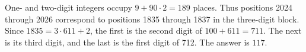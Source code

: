 One- and two-digit integers occupy $9+90\cdot2=189$ places. Thus positions 2024 through 2026 correspond to positions 1835 through 1837 in the three-digit block. Since $1835=3\cdot611+2$, the first is the second digit of $100+611=711$. The next is its third digit, and the last is the first digit of 712. The answer is $\boxed{117}$.
